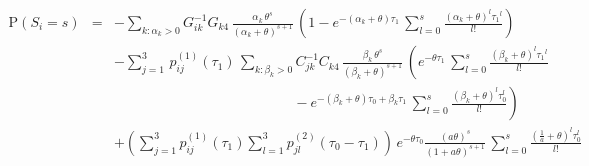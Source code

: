 \documentclass[11pt]{article}
\begin{document}
\small
\begin{eqnarray}
\label{eq:likelihood_single_2}
\mathrm{P}(S_{i}=s)
&=&-\displaystyle\sum_{k:\alpha_{k}>0}G^{-1}_{ik}G_{k4}\,\frac{\alpha_k\,\theta^s}{(\alpha_k+\theta)^{s+1}}\,\left( 1 - e^{-(\alpha_k+\theta) \tau_1}\,\sum_{l=0}^{s}\frac{\left(\alpha_k+\theta\right)^{l}{\tau_1}^{l}}{l!} \right) \nonumber \\
&&-\displaystyle \sum_{j=1}^{3}\,p^{(1)}_{ij}(\tau_{1})\, \displaystyle\sum_{k:\beta_{k}>0}C_{jk}^{-1}C_{k4}\, \frac{\beta_k\,\theta^s}{(\beta_k+\theta)^{s+1}}\,\left( e^{-\theta \tau_1}\,\sum_{l=0}^{s}\frac{\left(\beta_k+\theta\right)^{l}{\tau_1}^{l}}{l!}
\right.\nonumber\\
&&\left. 
~~~~~~~~~~~~~~~~~~~~~~~~~~~~~~~~~~~~~~~~~~~~~~~~~~~~~~~~~~-e^{-(\beta_k+\theta) \tau_0+\beta_{k}\tau_{1}}\,\sum_{l=0}^{s}\frac{\left(\beta_k+\theta\right)^{l}\tau_0^{l}}{l!} \right)
\nonumber\\
&&+\left(\displaystyle\sum_{j=1}^{3} p^{(1)}_{ij}(\tau_{1})\displaystyle\sum_{l=1}^{3}p^{(2)}_{jl}(\tau_{0}-\tau_{1})\right)\,e^{-\theta \tau_0}\frac{(a\theta)^s}{(1+a\theta)^{s+1}}\,\sum_{l=0}^{s}\frac{\left(\frac{1}{a}+\theta\right)^{l}\tau_0^{l}}{l!}
\nonumber\\
\end{eqnarray} 
\normalsize
\end{document}
